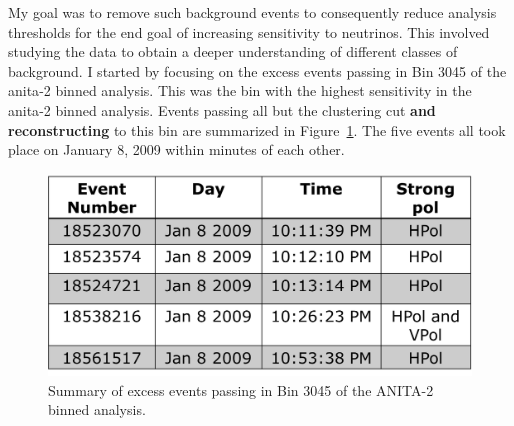 My goal was to remove such background events to consequently reduce analysis thresholds for the end goal of increasing sensitivity to neutrinos. This involved studying the data to obtain a deeper understanding of different classes of background. I started by focusing on the excess events passing in Bin 3045 of the \gls{anita}-2 binned analysis. This was the bin with the highest sensitivity in the \gls{anita}-2 binned analysis. Events passing all but the clustering cut {\bf and reconstructing} to this bin are summarized in Figure~\ref{bin3045}. The five events all took place on January 8, 2009 within minutes of each other.

\begin{figure}
\centering
\includegraphics[width=1.0\textwidth]{figures/bin3045_summary.png}
\caption{Summary of excess events passing in Bin 3045 of the ANITA-2 binned analysis.}
\label{bin3045}
\end{figure}

